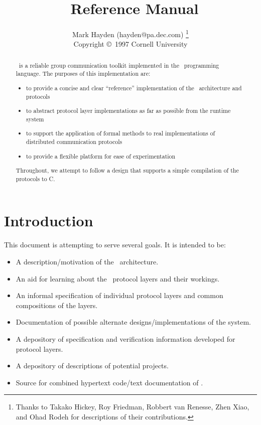 \documentclass[12pt]{article}
\title{\ensemble\ Reference Manual}
\author{Mark Hayden (hayden@pa.dec.com)
\thanks{Thanks to Takako Hickey, Roy Friedman, Robbert van Renesse,
Zhen Xiao, and Ohad Rodeh for descriptions of their contributions.} \\
\small{Copyright \copyright\ 1997 Cornell University}}
\begin{document}
\maketitle

\begin{abstract}
\ensemble\ is a reliable group communication toolkit implemented in the
\caml\ programming language.  The purposes of this implementation are:
\begin{itemize}
\item 
to provide a concise and clear ``reference'' implementation of the \ensemble\
architecture and protocols
\item 
to abstract protocol layer implementations as far as possible from the
runtime system
\item
to support the application of formal methods to real implementations of
distributed communication protocols
\item 
to provide a flexible platform for ease of experimentation
\end{itemize}
Throughout, we attempt to follow a design that supports a simple
compilation of the protocols to C.
\end{abstract}

\newpage
\tableofcontents
\newpage

\section{Introduction}

This document is attempting to serve several goals.  It is intended to be:
\begin{itemize}
\item
A description/motivation of the \ensemble\ architecture.
\item
An aid for learning about the \ensemble\ protocol layers and their workings.
\item
An informal specification of individual protocol layers and common
compositions of the layers.
\item
Documentation of possible alternate designs/implementations of the system.
\item
A depository of specification and verification information developed for
protocol layers.
\item
A depository of descriptions of potential projects.
\item
Source for combined hypertext code/text documentation of \ensemble.
\end{itemize}
\end{document}
